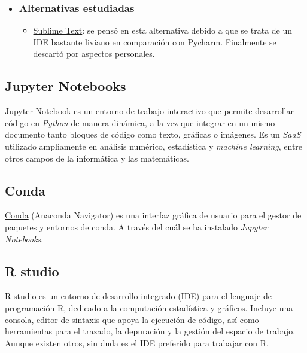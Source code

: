 \begin{itemize}
	\item \subsubsection{Alternativas estudiadas}
	\begin{itemize}
		\item \href{www.sublimetext.com}{Sublime Text}: se pensó en esta alternativa debido a que se trata de un IDE bastante liviano en comparación con Pycharm. Finalmente se descartó por aspectos personales.
	\end{itemize}
\end{itemize}


\subsection{Jupyter Notebooks}\label{herramientas_jupyter}
\href{https://www.jetbrains.com/pycharm/}{Jupyter Notebook} es un entorno de trabajo interactivo que permite desarrollar código en \textit{Python} de manera dinámica, a la vez que integrar en un mismo documento tanto bloques de código como texto, gráficas o imágenes. Es un \textit{SaaS} utilizado ampliamente en análisis numérico, estadística y \textit{machine learning}, entre otros campos de la informática y las matemáticas. 

\subsection{Conda}\label{herramientas_conda}
\href{https://docs.continuum.io/anaconda/navigator/getting-started/ }{Conda} (Anaconda Navigator) es una interfaz gráfica de usuario para el gestor de paquetes y entornos de conda. A través del cuál se ha instalado \textit{ Jupyter Notebooks}.

\subsection{R studio}\label{herramientas_r_studio}
\href{https://www.rstudio.com}{R studio} es un entorno de desarrollo integrado (IDE) para el lenguaje de programación R, dedicado a la computación estadística y gráficos. Incluye una consola, editor de sintaxis que apoya la ejecución de código, así como herramientas para el trazado, la depuración y la gestión del espacio de trabajo. Aunque existen otros, sin duda es el IDE preferido para trabajar con R.

